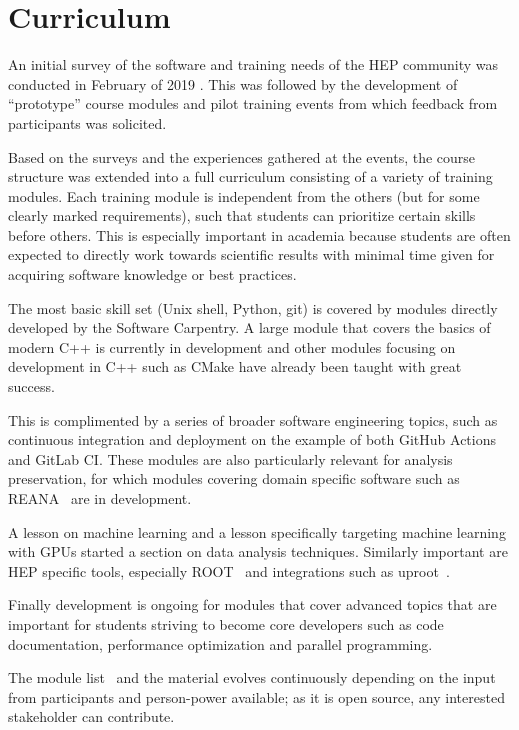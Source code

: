 \documentclass[twocolumn]{svjour3}          %
\begin{document}
\section{Curriculum}\label{sec:Curriculum}

An initial survey of the software and training needs of the HEP community was conducted in February of 2019 \cite{david_lange}. This was followed by the development of \enquote{prototype} course modules and  pilot training events from which feedback from participants was solicited.

Based on the surveys and the experiences gathered at the events, the course structure was extended into a full curriculum consisting of a variety of training modules.
Each training module is independent from the others (but for some clearly marked requirements), such that students can prioritize certain skills before others. This is especially important in academia because students are often expected to directly work towards scientific results with minimal time given for acquiring software knowledge or best practices.

The most basic skill set (Unix shell, Python, git) is covered by modules directly developed by the Software Carpentry. A large module that covers the basics of modern C++ is currently in development and other modules focusing on development in C++ such as CMake have already been taught with great success.

This is complimented by a series of broader software engineering topics, such as continuous integration and deployment on the example of both GitHub Actions and GitLab CI. These modules are also particularly relevant for analysis preservation, for which modules covering domain specific software such as REANA~\cite{reana} are in development.

A lesson on machine learning and a lesson specifically targeting machine learning with GPUs started a section on data analysis techniques. Similarly important are HEP specific tools, especially ROOT~\cite{root_cern} and integrations such as uproot~\cite{uproot}.

Finally development is ongoing for modules that cover advanced topics that are important for students striving to become core developers such as code documentation, performance optimization and parallel programming.

The module list~\cite{HSF-curriculum} and the material evolves continuously depending on the input from participants and person-power available; as it is open source, any interested stakeholder can contribute.
\end{document}
